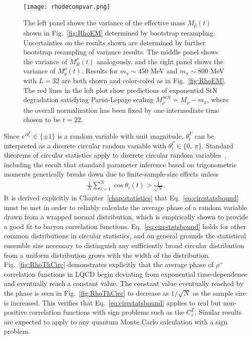 \begin{figure}[!t] \centering
  \texttt{[image: rhodecompvar.png]}
  \caption{The left panel shows the variance of the effective mass $M_\rho(t)$ shown in Fig.~\ref{fig:RhoEM} determined by bootstrap resampling. Uncertainties on the results shown are determined by further bootstrap resampling of variance results. The middle panel shows the variance of $M_R^\rho(t)$ analogously, and the right panel shows the variance of $M_\theta^\rho(t)$. Results for $m_\pi \sim 450$ MeV and $m_\pi \sim 800$ MeV with $L=32$ are both shown and color-coled as in Fig.~\ref{fig:RhoEM}. The red lines in the left plot show predictions of exponential StN degradation satisfying Parisi-Lepage scaling $M_\rho^{StN} = M_\rho - m_\pi$, where the overall normalization has been fixed by one intermediate time chosen to be $t=22$.
  }
  \label{fig:RhoEMErrors}
\end{figure}

Since $e^{i \theta_i^\Gamma} \in \{\pm 1\}$ is a random variable with unit magnitude, $\theta_i^\Gamma$ can be interpreted as a discrete circular random variable with $\theta_i^\Gamma \in \{0,\ \pi\}$.
Standard theorems of circular statistics apply to discrete circular random variables~\cite{Fisher:1995,jammalamadaka2001topics,Mardia:2009},
including the result that standard parameter inference based on trigonometric moments generically breaks down due to finite-sample-size effects unless
\begin{equation}
  \begin{split}
    \frac{1}{N}\sum_{i=1}^N \cos\theta_i(t) > \frac{1}{\sqrt{N}}.
  \end{split}\label{eq:circstatsbound}
\end{equation}
It is derived explicitly in Chapter~\ref{chap:statistics} that Eq.~\eqref{eq:circstatsbound} must be met in order to reliably calculate the average phase of a random variable drawn from a wrapped normal distribution, which is empirically shown to provide a good fit to baryon correlation functions. 
Eq.~\eqref{eq:circstatsbound} holds for other common distributions in circular statistics, and on general grounds the statistical ensemble size necessary to distinguish any sufficiently broad circular distribution from a uniform distribution grows with the width of the distribution.
Fig.~\ref{fig:RhoThCirc} demonstrates explicitly that the average phase of $\rho^+$ correlation functions in LQCD begin deviating from exponential time-dependence and eventually reach a constant value.
The constant value eventually reached by the phase is seen in Fig.~\ref{fig:RhoThCirc} to decrease as $1/\sqrt{N}$ as the sample size is increased.
This verifies that Eq.~\eqref{eq:circstatsbound} applies to real but non-positive correlation functions with sign problems such as the $C_i^\Gamma$.
Similar results are expected to apply to any quantum Monte Carlo calculation with a sign problem.


